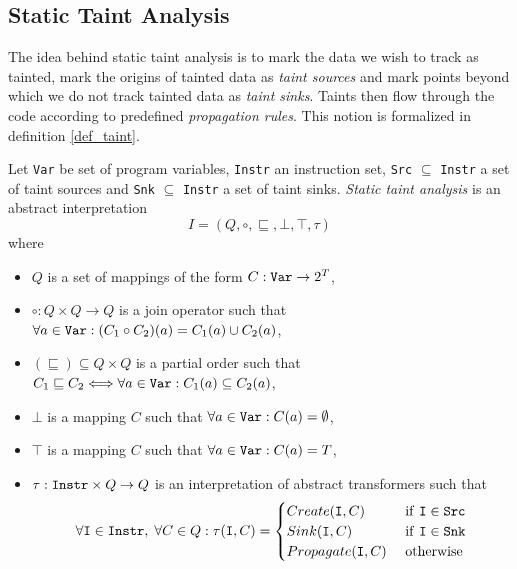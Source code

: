 \subsection{Static Taint Analysis}
The idea behind static taint analysis is to mark the data we wish to track as tainted, mark the origins of tainted data as \emph{taint sources} and mark points beyond which we do not track tainted data as \emph{taint sinks}. Taints then flow through the code according to predefined \emph{propagation rules}. This notion is formalized in definition \ref{def_taint}.

\begin{defn}
\label{def_taint}
Let \texttt{Var} be set of program variables, \texttt{Instr} an instruction set, \texttt{Src} $\subseteq$ \texttt{Instr} a set of taint sources and \texttt{Snk} $\subseteq$ \texttt{Instr} a set of taint sinks. \emph{Static taint analysis} is an abstract interpretation $$I = (Q, \circ, \sqsubseteq, \bot, \top, \tau)$$ where
    \begin{itemize}
        \item $Q$ is a set of mappings of the form $C: \text{\texttt{Var}} \rightarrow 2^T$,
        \item $\circ: Q \times Q \rightarrow Q$ is a join operator such that $\forall a \in \text{\texttt{Var}}: (C_1 \circ C_2)(a) = C_1(a) \cup C_2(a)$,
        \item $(\sqsubseteq) \subseteq Q \times Q$ is a partial order such that $C_1 \sqsubseteq C_2 \Longleftrightarrow \forall a \in \text{\texttt{Var}}: C_1(a) \subseteq C_2(a)$,  
        \item $\bot$ is a mapping $C$ such that $\forall a \in \text{\texttt{Var}}: C(a) = \emptyset$,
        \item $\top$ is a mapping $C$ such that $\forall a \in \text{\texttt{Var}}: C(a) = T$,
        \item $\tau: \text{\texttt{Instr}}\times Q \rightarrow Q$ is an interpretation of abstract transformers such that
        \begin{equation*}
            \forall \text{\texttt{I}} \in \text{\texttt{Instr}}, \; \forall C \in Q: \tau(\text{\texttt{I}},C) = 
            \begin{cases}
                Create(\text{\texttt{I}}, C) & \text{ if \texttt{I}} \in \text{\texttt{Src}}\\
                Sink(\text{\texttt{I}}, C) & \text{ if \texttt{I}} \in \text{\texttt{Snk}}\\
                Propagate(\text{\texttt{I}}, C) & \text{ otherwise}

\end{cases}
\end{equation*}
\end{itemize}
\end{defn}
